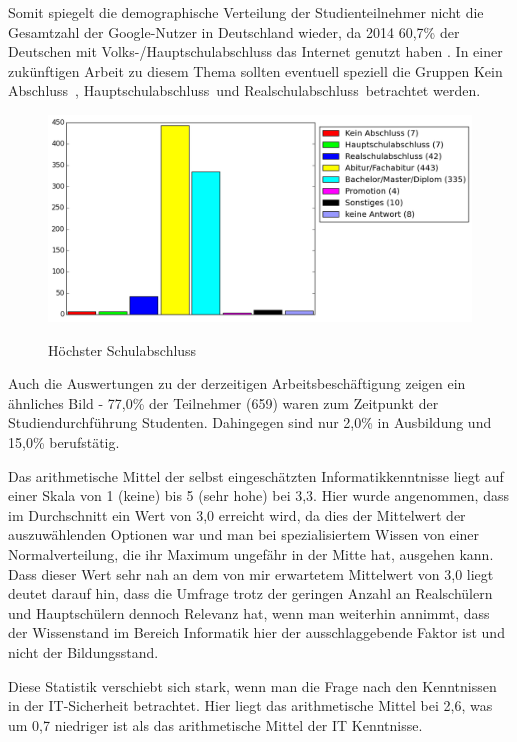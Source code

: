 Somit spiegelt die demographische Verteilung der Studienteilnehmer nicht die Gesamtzahl der Google-Nutzer in Deutschland wieder, da 2014 60,7\% der Deutschen mit Volks-/Hauptschulabschluss das Internet genutzt haben \cite{statistabildung}. In einer zukünftigen Arbeit zu diesem Thema sollten eventuell speziell die Gruppen \glqq Kein Abschluss\grqq\ , \glqq Hauptschulabschluss\grqq\ und \glqq Realschulabschluss\grqq\ betrachtet werden.

\begin{figure}[H]
\centering
\includegraphics[scale=0.55]{images/schulabschluss}\\
\caption{Höchster Schulabschluss}\label{schulabschluss}
\end{figure}
Auch die Auswertungen zu der derzeitigen Arbeitsbeschäftigung zeigen ein ähnliches Bild - 77,0\% der Teilnehmer (659) waren zum Zeitpunkt der Studiendurchführung Studenten. Dahingegen sind nur 2,0\% in Ausbildung und 15,0\% berufstätig.

Das arithmetische Mittel der selbst eingeschätzten Informatikkenntnisse liegt auf einer Skala von 1 (keine) bis 5 (sehr hohe) bei 3,3. Hier wurde angenommen, dass im Durchschnitt ein Wert von 3,0 erreicht wird, da dies der Mittelwert der auszuwählenden Optionen war und man bei spezialisiertem Wissen von einer Normalverteilung, die ihr Maximum ungefähr in der Mitte hat, ausgehen kann. Dass dieser Wert sehr nah an dem von mir erwartetem Mittelwert von 3,0 liegt deutet darauf hin, dass die Umfrage trotz der geringen Anzahl an Realschülern und Hauptschülern dennoch Relevanz hat, wenn man weiterhin annimmt, dass der Wissenstand im Bereich Informatik hier der ausschlaggebende Faktor ist und nicht der Bildungsstand.

Diese Statistik verschiebt sich stark, wenn man die Frage nach den Kenntnissen in der IT-Sicherheit betrachtet. Hier liegt das arithmetische Mittel bei 2,6, was um 0,7 niedriger ist als das arithmetische Mittel der IT Kenntnisse.

